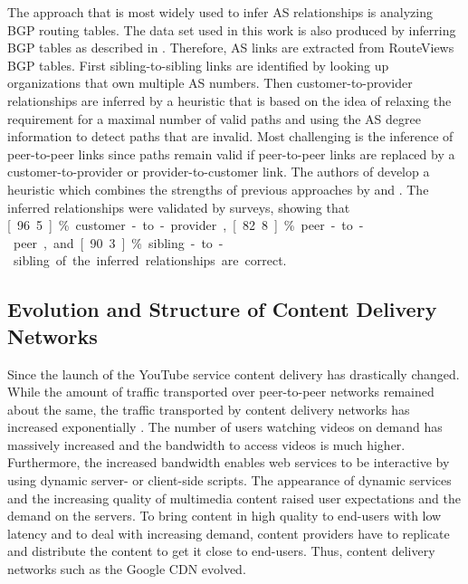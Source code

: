 The approach that is most widely used to infer AS relationships is analyzing BGP routing tables. The data set used in this work is also produced by inferring BGP tables as described in \cite{dimitropoulos2007relationships}. Therefore, AS links are extracted from RouteViews BGP tables. First sibling-to-sibling links are identified by looking up organizations that own multiple AS numbers. Then customer-to-provider relationships are inferred by a heuristic that is based on the idea of relaxing the requirement for a maximal number of valid paths and using the AS degree information to detect paths that are invalid. Most challenging is the inference of peer-to-peer links since paths remain valid if peer-to-peer links are replaced by a customer-to-provider or provider-to-customer link. The authors of \cite{dimitropoulos2007relationships} develop a heuristic which combines the strengths of previous approaches by \cite{gao2001} and \cite{di2003computing}. The inferred relationships were validated by surveys, showing that \unit[96.5]{\%} customer-to-provider, \unit[82.8]{\%} peer-to-peer, and \unit[90.3]{\%} sibling-to-sibling of the inferred relationships are correct.

\subsection{Evolution and Structure of Content Delivery Networks}
Since the launch of the YouTube service content delivery has drastically changed.
While the amount of traffic transported over peer-to-peer networks remained about the same, the traffic transported by content delivery networks has increased exponentially \cite{cisco2015}.
The number of users watching videos on demand has massively increased and the bandwidth to access videos is much higher.
Furthermore, the increased bandwidth enables web services to be interactive by using dynamic server- or client-side scripts.
The appearance of dynamic services and the increasing quality of multimedia content raised user expectations and the demand on the servers.
To bring content in high quality to end-users with low latency and to deal with increasing demand, content providers have to replicate and distribute the content to get it close to end-users.
Thus, content delivery networks such as the Google CDN evolved.

